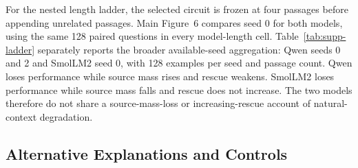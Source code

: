 \documentclass[letterpaper]{article} %
\begin{document}
For the nested length ladder, the selected circuit is frozen at four passages before appending unrelated
passages. Main Figure~6 compares seed 0 for both models, using the same 128 paired questions in every
model-length cell. Table~\ref{tab:supp-ladder} separately reports the broader available-seed aggregation:
Qwen seeds 0 and 2 and SmolLM2 seed 0, with 128 examples per seed and passage count. Qwen loses performance while
source mass rises and rescue weakens. SmolLM2 loses performance while source mass falls and rescue does not
increase. The two models therefore do not share a source-mass-loss or increasing-rescue account of
natural-context degradation.

\begin{table}[t]
\centering
\scriptsize
\setlength{\tabcolsep}{2.5pt}
%
\caption{Natural-QA 32-minus-4-passage changes with hierarchical 95\% intervals. This robustness table uses
all passing seeds available for each model and is separate from the seed-0 matched comparison in Main Figure~6.}
\label{tab:supp-ladder}
\end{table}

\FloatBarrier
\subsection{Alternative Explanations and Controls}
\end{document}

